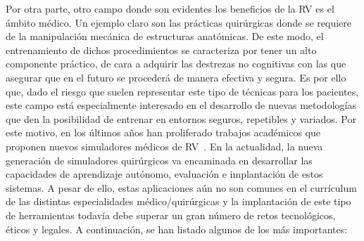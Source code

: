 Por otra parte, otro campo donde son evidentes los beneficios de la \ac{RV} es  el ámbito médico. Un ejemplo claro son las prácticas quirúrgicas donde se requiere de la manipulación mecánica de estructuras anatómicas. De este modo, el entrenamiento de dichos procedimientos se caracteriza por tener un alto componente práctico, de cara a adquirir las destrezas no cognitivas con las que asegurar que en el futuro se procederá de manera efectiva y segura.
Es por ello que, dado el riesgo que suelen representar este tipo de técnicas para los pacientes, este campo está especialmente interesado en el desarrollo de nuevas metodologías que den la posibilidad de entrenar en entornos seguros, repetibles y variados. Por este motivo, en los últimos años han proliferado trabajos académicos que proponen nuevos simuladores médicos de \ac{RV}~\cite{korzeniowski2018vcsim3,cecil2017advanced}. En la actualidad, la nueva generación de simuladores quirúrgicos va encaminada en desarrollar las capacidades de aprendizaje autónomo, evaluación e implantación de estos sistemas. A pesar de ello, estas aplicaciones aún no son comunes en el currículum de las distintas especialidades médico/quirúrgicas y la implantación de este tipo de herramientas todavía debe superar un gran número de retos tecnológicos, éticos y legales. A continuación, se han listado algunos de los más importantes:
